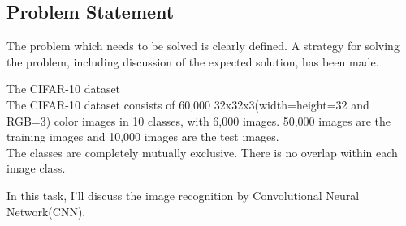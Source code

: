 \subsection{Problem Statement}
The problem which needs to be solved is clearly defined. A strategy for solving the problem, including discussion of the expected solution, has been made.







{\Large The CIFAR-10 dataset}\\
The CIFAR-10 dataset consists of 60,000 32x32x3(width=height=32 and RGB=3) color images in 10 classes, with 6,000 images. 50,000 images are the training images and 10,000 images are the test images.\\
The classes are completely mutually exclusive. There is no overlap within each image class.

In this task, I'll discuss the image recognition by Convolutional Neural Network(CNN).


